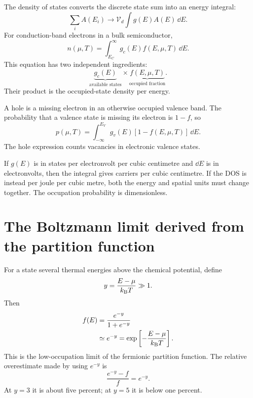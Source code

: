 The density of states converts the discrete state sum into an energy integral:
\begin{equation}
  \sum_i A(E_i)
  \longrightarrow
  \mathcal V_d\int g(E)A(E)\,\dd E.
  \label{eq:state-sum-to-dos-integral}
\end{equation}
For conduction-band electrons in a bulk semiconductor,
\begin{equation}
  \boxed{
  n(\mu,T)
  =\int_{E_C}^{\infty}
   g_c(E)f(E,\mu,T)\,\dd E.
  }
  \label{eq:statmech-electron-concentration}
\end{equation}
This equation has two independent ingredients:
\begin{equation}
  \underbrace{g_c(E)}_{\text{available states}}
  \times
  \underbrace{f(E,\mu,T)}_{\text{occupied fraction}}.
  \label{eq:states-times-occupation}
\end{equation}
Their product is the occupied-state density per energy.

A hole is a missing electron in an otherwise occupied valence band.  The
probability that a valence state is missing its electron is $1-f$, so
\begin{equation}
  \boxed{
  p(\mu,T)
  =\int_{-\infty}^{E_V}
   g_v(E)[1-f(E,\mu,T)]\,\dd E.
  }
  \label{eq:statmech-hole-concentration}
\end{equation}
The hole expression counts vacancies in electronic valence states.

\begin{modelcheck}
If $g(E)$ is in states per electronvolt per cubic centimetre and $\dd E$ is in
electronvolts, then the integral gives carriers per cubic centimetre.  If the
DOS is instead per joule per cubic metre, both the energy and spatial units must
change together.  The occupation probability is dimensionless.
\end{modelcheck}

\section{The Boltzmann limit derived from the partition function}

For a state several thermal energies above the chemical potential, define
\begin{equation}
  y=\frac{E-\mu}{k_{\mathrm B} T}\gg1.
  \label{eq:statmech-boltzmann-reduced-energy}
\end{equation}
Then
\begin{equation}
\begin{aligned}
  f(E)
  &=\frac{e^{-y}}{1+e^{-y}}\\
  &\simeq e^{-y}
  =\exp\left[-\frac{E-\mu}{k_{\mathrm B} T}\right].
\end{aligned}
  \label{eq:statmech-boltzmann-tail}
\end{equation}
This is the low-occupation limit of the fermionic partition function.  The
relative overestimate made by using
$e^{-y}$ is
\begin{equation}
  \frac{e^{-y}-f}{f}=e^{-y}.
  \label{eq:statmech-boltzmann-relative-error}
\end{equation}
At $y=3$ it is about five percent; at $y=5$ it is below one percent.

